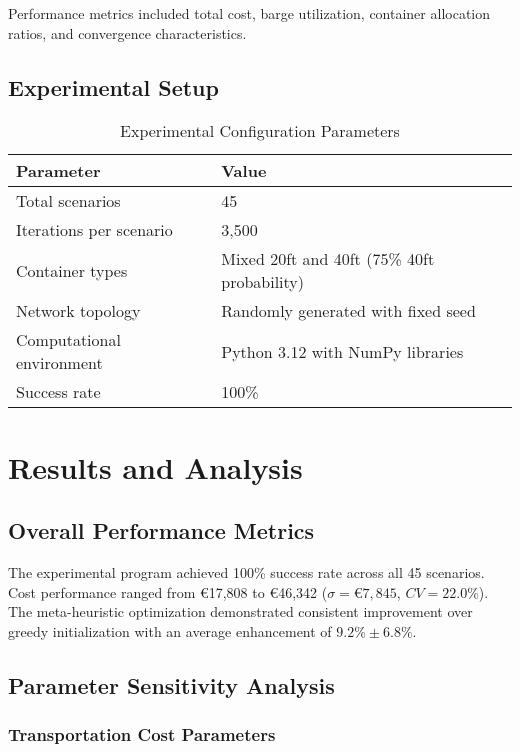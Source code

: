 \documentclass[12pt,a4paper]{article}
\begin{document}
Performance metrics included total cost, barge utilization, container allocation ratios, and convergence characteristics.

\subsection{Experimental Setup}

\begin{table}[H]
\centering
\caption{Experimental Configuration Parameters}
\begin{tabular}{@{}ll@{}}
\toprule
Parameter & Value \\
\midrule
Total scenarios & 45 \\
Iterations per scenario & 3,500 \\
Container types & Mixed 20ft and 40ft (75\% 40ft probability) \\
Network topology & Randomly generated with fixed seed \\
Computational environment & Python 3.12 with NumPy libraries \\
Success rate & 100\% \\
\bottomrule
\end{tabular}
\end{table}

\section{Results and Analysis}

\subsection{Overall Performance Metrics}

The experimental program achieved 100\% success rate across all 45 scenarios. Cost performance ranged from €17,808 to €46,342 ($\sigma = €7,845$, $CV = 22.0\%$). The meta-heuristic optimization demonstrated consistent improvement over greedy initialization with an average enhancement of $9.2\% \pm 6.8\%$.

\subsection{Parameter Sensitivity Analysis}

\subsubsection{Transportation Cost Parameters}
\end{document}
